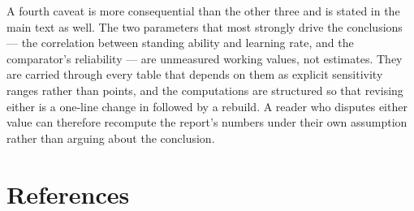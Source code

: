 A fourth caveat is more consequential than the other three and is stated in the
main text as well. The two parameters that most strongly drive the conclusions
--- the correlation between standing ability and learning rate, and the
comparator's reliability --- are unmeasured working values, not estimates. They
are carried through every table that depends on them as explicit sensitivity
ranges rather than points, and the computations are structured so that revising
either is a one-line change in  followed by a rebuild.
A reader who disputes either value can therefore recompute the report's numbers
under their own assumption rather than arguing about the conclusion.

\section*{References}
\small
\sloppy

